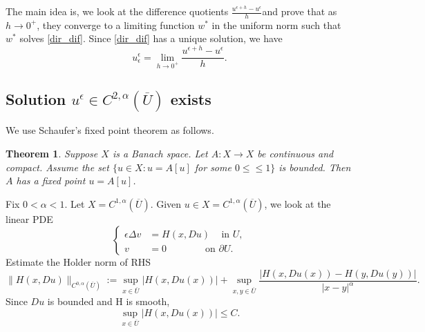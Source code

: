 \documentclass[11pt,reqno]{amsart}
\numberwithin{figure}{section}
\theoremstyle{plain}
\newtheorem{thm}{Theorem}[section]
\theoremstyle{remark}
\numberwithin{equation}{section}
\begin{document}
\begin{appendices}
\noindent The main idea is, we look at the difference quotients $\displaystyle \frac{u^{\epsilon+h}-u^\epsilon}{h}$and prove that as $h \to 0^+$, they converge to a limiting function $w^{\ast}$ in the uniform norm  such that $w^{\ast}$ solves \eqref{dir_dif}. Since \eqref{dir_dif} has a unique solution, we have $$u^\epsilon_\epsilon=\lim_{h \to 0^+}\frac{u^{\epsilon+h}-u^\epsilon}{h}.$$

\subsection{Solution $u^\epsilon \in C^{2,\alpha}(\overline{U})$ exists} We use Schaufer's fixed point theorem as follows.

\begin{thm} Suppose $X$ is a Banach space. Let $A:X \to X$ be continuous and compact. Assume the set $\{u\in X : u=  A[u]$ for some $0 \leq    \leq 1\}$ is bounded. Then $A$ has a fixed point $u =A[u]$.
\end{thm}
\noindent Fix $0<\alpha<1$. Let $X=C^{1,\alpha}(\overline{U})$. Given $u \in X=C^{1,\alpha}(\overline{U})$, we look at the linear PDE
\begin{equation}
\label{fix}
\left\{
  \begin{aligned}
   \epsilon \Delta v &= H(x, Du) \quad \, \text{in } U, \\
              v &= 0 \qquad \qquad \text{on } \partial U.
  \end{aligned}
\right.
\end{equation}
\noindent
Estimate the Holder norm of RHS
$$\|H(x, Du)\|_{C^{0, \alpha}(\overline{U})}:=\sup_{x\in\overline{U}} |H(x,Du(x))| + \sup_{x, y \in \overline{U}}\frac{|H(x, Du(x))-H(y, Du(y))|}{|x-y|^\alpha}.$$
Since $Du$ is bounded and H is smooth,
\begin{equation}
    \sup_{x\in\overline{U}} |H(x,Du(x))| \leq C.
\end{equation}


\end{appendices}
\end{document}

